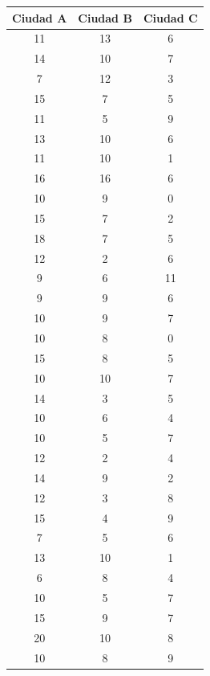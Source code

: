 \documentclass{article} %
\begin{document}
\begin{table}[H]
	\centering
		\begin{tabular}{|| c | c | c ||}
			\hline
			\hline
			Ciudad A & Ciudad B & Ciudad C\\
			\hline
			\hline		
			11 & 13 & 6\\
			\hline
			14 & 10 & 7\\
			\hline
			7 & 12 & 3\\
			\hline
			15 & 7 & 5\\
			\hline
			11 & 5 & 9\\
			\hline
			13 & 10 & 6\\
			\hline
			11 & 10 & 1\\
			\hline
			16 & 16 & 6\\
			\hline
			10 & 9 & 0\\
			\hline
			15 & 7 & 2\\
			\hline
			18 & 7 & 5\\
			\hline
			12 & 2 & 6\\
			\hline
			9 & 6 & 11\\
			\hline
			9 & 9 & 6\\
			\hline
			10 & 9 & 7\\
			\hline
			10 & 8 & 0\\
			\hline
			15 & 8 & 5\\
			\hline
			10 & 10 & 7\\
			\hline
			14 & 3 & 5\\
            \hline
            10 & 6 & 4\\
            \hline
            10 & 5 & 7\\
            \hline
            12 & 2 & 4\\
            \hline
            14 & 9 & 2\\
            \hline
            12 & 3 & 8\\
            \hline
            15 & 4 & 9\\
            \hline
            7 & 5 & 6\\
            \hline
            13 & 10 & 1\\
            \hline
            6 & 8 & 4\\
            \hline
            10 & 5 & 7\\
            \hline
            15 & 9 & 7\\
            \hline
            20 & 10 & 8\\
            \hline
            10 & 8 & 9\\

\end{tabular}
\end{table}
\end{document}
